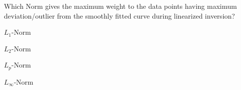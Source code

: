     \item Which Norm gives the maximum weight to the data points having maximum deviation/outlier from the smoothly fitted curve during linearized inversion? \hfill{}
        \begin{enumerate}
            \begin{multicols}{4}
                \item $L_1$-Norm
                \item $L_2$-Norm
                \item $L_p$-Norm
                \item $L_\infty$-Norm
            \end{multicols}
        \end{enumerate}
    
